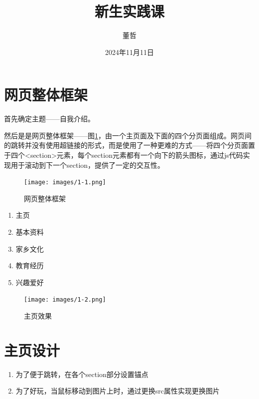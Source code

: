 \documentclass[supercite]{Experimental_Report}
\title{~~~~~~新生实践课~~~~~~}
\author{董哲}
\date{2024年11月11日}
\theoremstyle{definition}
\begin{document}
\maketitle

\clearpage


\tableofcontents[level=2]
\clearpage


\section{网页整体框架}
首先确定主题——自我介绍。

然后是是网页整体框架——图\ref{fig1-1}，由一个主页面及下面的四个分页面组成。网页间的跳转并没有使用超链接的形式，而是使用了一种更难的方式——将四个分页面置于四个<section>元素，每个section元素都有一个向下的箭头图标，通过js代码实现用于滚动到下一个section，提供了一定的交互性。



\begin{figure}[htb] %
	\begin{center}
		\texttt{[image: images/1-1.png]}
		\caption{网页整体框架}
		\label{fig1-1}
	\end{center}
\end{figure}



\begin{enumerate}
\renewcommand{\labelenumi}{\theenumi)}
	\item 主页
	\item 基本资料
	\item 家乡文化
        \item 教育经历
        \item 兴趣爱好
\end{enumerate}

\begin{figure}[htb]
	\begin{center}
		\texttt{[image: images/1-2.png]}
		\caption{主页效果}
		\label{fig1-2}
	\end{center}
\end{figure}




\newpage

\section{主页设计}
\begin{enumerate}
\renewcommand{\labelenumi}{\theenumi)}
	\item 为了便于跳转，在各个section部分设置锚点
	
	\item 为了好玩，当鼠标移动到图片上时，通过更换src属性实现更换图片
\end{enumerate}
\end{document}
